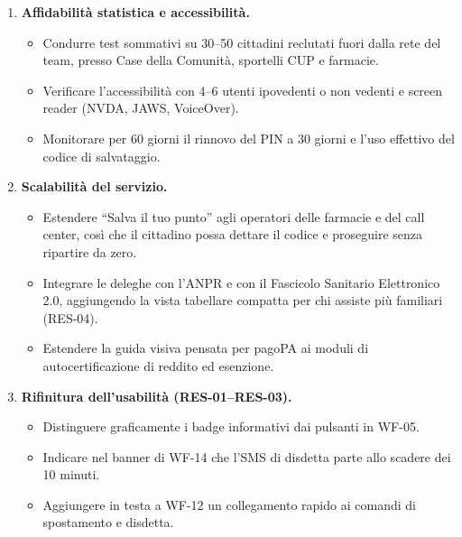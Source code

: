 \begin{enumerate}
\item \textbf{Affidabilità statistica e accessibilità.}
  \begin{itemize}
  \item Condurre test sommativi su 30--50 cittadini reclutati fuori dalla rete del team, presso Case della Comunità, sportelli CUP e farmacie.
  \item Verificare l'accessibilità con 4--6 utenti ipovedenti o non vedenti e screen reader (NVDA, JAWS, VoiceOver).
  \item Monitorare per 60 giorni il rinnovo del PIN a 30 giorni e l'uso effettivo del codice di salvataggio.
  \end{itemize}
\item \textbf{Scalabilità del servizio.}
  \begin{itemize}
  \item Estendere ``Salva il tuo punto'' agli operatori delle farmacie e del call center, così che il cittadino possa dettare il codice e proseguire senza ripartire da zero.
  \item Integrare le deleghe con l'ANPR e con il Fascicolo Sanitario Elettronico 2.0, aggiungendo la vista tabellare compatta per chi assiste più familiari (RES-04).
  \item Estendere la guida visiva pensata per pagoPA ai moduli di autocertificazione di reddito ed esenzione.
  \end{itemize}
\item \textbf{Rifinitura dell'usabilità (RES-01--RES-03).}
  \begin{itemize}
  \item Distinguere graficamente i badge informativi dai pulsanti in WF-05.
  \item Indicare nel banner di WF-14 che l'SMS di disdetta parte allo scadere dei 10 minuti.
  \item Aggiungere in testa a WF-12 un collegamento rapido ai comandi di spostamento e disdetta.
  \end{itemize}
\end{enumerate}
